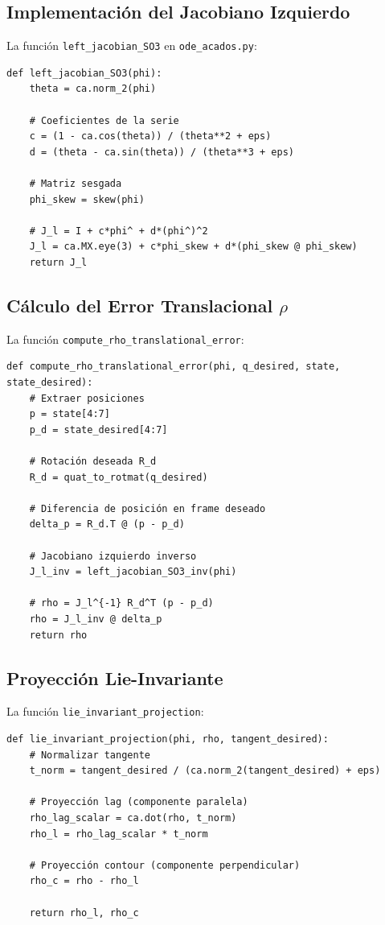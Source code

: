 \documentclass[11pt,a4paper]{article}
\begin{document}
\subsection{Implementación del Jacobiano Izquierdo}

La función \texttt{left\_jacobian\_SO3} en \texttt{ode\_acados.py}:

\begin{verbatim}
def left_jacobian_SO3(phi):
    theta = ca.norm_2(phi)
    
    # Coeficientes de la serie
    c = (1 - ca.cos(theta)) / (theta**2 + eps)
    d = (theta - ca.sin(theta)) / (theta**3 + eps)
    
    # Matriz sesgada
    phi_skew = skew(phi)
    
    # J_l = I + c*phi^ + d*(phi^)^2
    J_l = ca.MX.eye(3) + c*phi_skew + d*(phi_skew @ phi_skew)
    return J_l
\end{verbatim}

\subsection{Cálculo del Error Translacional $\rho$}

La función \texttt{compute\_rho\_translational\_error}:

\begin{verbatim}
def compute_rho_translational_error(phi, q_desired, state, state_desired):
    # Extraer posiciones
    p = state[4:7]
    p_d = state_desired[4:7]
    
    # Rotación deseada R_d
    R_d = quat_to_rotmat(q_desired)
    
    # Diferencia de posición en frame deseado
    delta_p = R_d.T @ (p - p_d)
    
    # Jacobiano izquierdo inverso
    J_l_inv = left_jacobian_SO3_inv(phi)
    
    # rho = J_l^{-1} R_d^T (p - p_d)
    rho = J_l_inv @ delta_p
    return rho
\end{verbatim}

\subsection{Proyección Lie-Invariante}

La función \texttt{lie\_invariant\_projection}:

\begin{verbatim}
def lie_invariant_projection(phi, rho, tangent_desired):
    # Normalizar tangente
    t_norm = tangent_desired / (ca.norm_2(tangent_desired) + eps)
    
    # Proyección lag (componente paralela)
    rho_lag_scalar = ca.dot(rho, t_norm)
    rho_l = rho_lag_scalar * t_norm
    
    # Proyección contour (componente perpendicular)
    rho_c = rho - rho_l
    
    return rho_l, rho_c
\end{verbatim}
\end{document}
